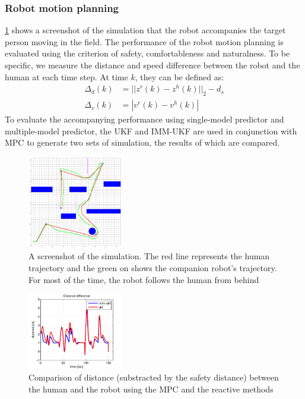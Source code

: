 \documentclass[letterpaper, 10 pt, conference]{ieeeconf}
\begin{document}
	\subsubsection{Robot motion planning}\label{subsubsec:motion_plan}
	\cref{fig:robot_accom} shows a screenshot of the simulation that the robot accompanies the target person moving in the field.
	The performance of the robot motion planning is evaluated using the criterion of safety, comfortableness and naturalness.
	To be specific, we measure the distance and speed difference between the robot and the human at each time step.
	At time $k$, they can be defined as:
	\begin{subequations}
		\begin{align}
		\Delta_d(k)&=||z^r(k)-z^h(k)||_2-d_s\label{eqn:err_d}\\
		\Delta_v(k)&=|v^r(k)-v^h(k)|\label{eqn:err_v}
		\end{align}
	\end{subequations}
	To evaluate the accompanying performance using single-model predictor and multiple-model predictor, the UKF and IMM-UKF are used in conjunction with MPC to generate two sets of simulation, the results of which are compared.
	\begin{figure}
		\centering
		\includegraphics[width=0.37\textwidth]{figures/r_accomp.pdf}
		\caption{A screenshot of the simulation. The red line represents the human trajectory and the green on shows the companion robot's trajectory. For most of the time, the robot follows the human from behind}
		\label{fig:robot_accom}
	\end{figure}
	\begin{figure}
		\centering
		\includegraphics[width=0.37\textwidth]{figures/dis_diff.pdf}
		\caption{Comparison of distance (substracted by the safety distance) between the human and the robot using the MPC and the reactive methods}
		\label{fig:err_d}
	\end{figure}
	
\end{document}
